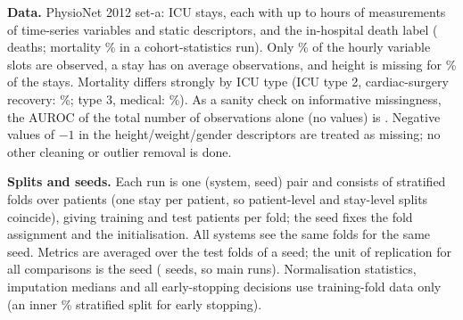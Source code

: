 \textbf{Data.} PhysioNet 2012 set-a:  ICU stays, each with up to  hours of measurements of  time-series variables and  static descriptors, and the in-hospital death label ( deaths; mortality \% in a cohort-statistics run). Only \% of the hourly variable slots are observed, a stay has on average  observations, and height is missing for \% of the stays. Mortality differs strongly by ICU type (ICU type 2, cardiac-surgery recovery: \%; type 3, medical: \%). As a sanity check on informative missingness, the AUROC of the total number of observations alone (no values) is . Negative values of $-1$ in the height/weight/gender descriptors are treated as missing; no other cleaning or outlier removal is done.

\textbf{Splits and seeds.} Each run is one (system, seed) pair and consists of  stratified folds over patients (one stay per patient, so patient-level and stay-level splits coincide), giving  training and  test patients per fold; the seed fixes the fold assignment and the initialisation. All systems see the same folds for the same seed. Metrics are averaged over the test folds of a seed; the unit of replication for all comparisons is the seed ( seeds, so  main runs). Normalisation statistics, imputation medians and all early-stopping decisions use training-fold data only (an inner \% stratified split for early stopping).

